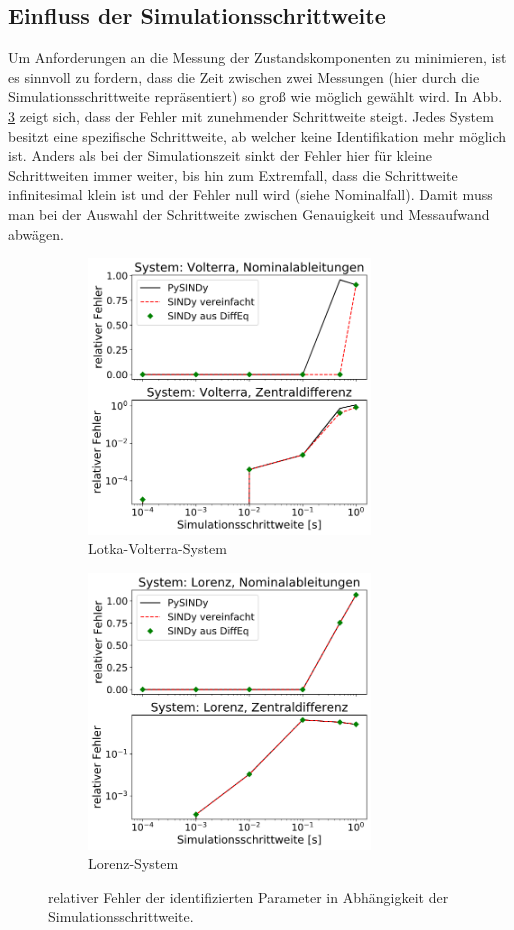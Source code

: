 \subsection{Einfluss der Simulationsschrittweite}
Um Anforderungen an die Messung der Zustandskomponenten zu minimieren, ist es sinnvoll zu fordern, dass die Zeit zwischen zwei Messungen (hier durch die Simulationsschrittweite repräsentiert) so groß wie möglich gewählt wird. In Abb. \ref{fig:errors_dt} zeigt sich, dass der Fehler mit zunehmender Schrittweite steigt. Jedes System besitzt eine spezifische Schrittweite, ab welcher keine Identifikation mehr möglich ist. Anders als bei der Simulationszeit sinkt der Fehler hier für kleine Schrittweiten immer weiter, bis hin zum Extremfall, dass die Schrittweite infinitesimal klein ist und der Fehler null wird (siehe Nominalfall). Damit muss man bei der Auswahl der Schrittweite zwischen Genauigkeit und Messaufwand abwägen.
\begin{figure} %
	\centering
	\begin{subfigure}{.5\textwidth}
	  \centering
	  \includegraphics[width=75mm]{images/errors_volterra_dt_variation.png}
	  \caption{Lotka-Volterra-System}
	  \label{fig:errors_volterra_dt}
	\end{subfigure}%
	\begin{subfigure}{.5\textwidth}
	  \centering
	  \includegraphics[width=75mm]{images/errors_lorenz_dt_variation.png}
	  \caption{Lorenz-System}
	  \label{fig:errors_lorenz_dt}
	\end{subfigure}
	\caption{relativer Fehler der identifizierten Parameter in Abhängigkeit der Simulationsschrittweite.}
	\label{fig:errors_dt}
\end{figure}

